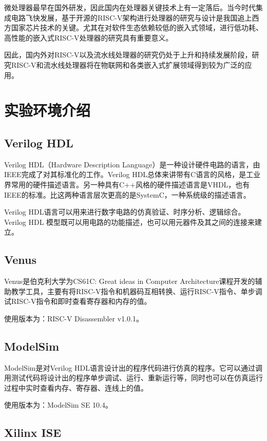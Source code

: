 \documentclass[UTF8,a4paper,autofakebold,15pt]{ctexart}
\begin{document}
	微处理器最早在国外研发，因此国内在处理器关键技术上有一定落后。当今时代集成电路飞快发展，基于开源的RISC-V架构进行处理器的研究与设计是我国追上西方国家芯片技术的关键。尤其在对软件生态依赖较低的嵌入式领域，进行低功耗、高性能的嵌入式RISC-V处理器的研究具有重要意义。\cite{ref6}
	
	因此，国内外对RISC-V以及流水线处理器的研究仍处于上升和持续发展阶段，研究RISC-V和流水线处理器将在物联网和各类嵌入式扩展领域得到较为广泛的应用。

\newpage

\section{实验环境介绍}

\subsection{Verilog HDL}
	Verilog HDL（Hardware Description Language）是一种设计硬件电路的语言，由IEEE完成了对其标准化的工作。Verilog HDL总体来讲带有C语言的风格，是工业界常用的硬件描述语言。另一种具有C++风格的硬件描述语言是VHDL，也有IEEE的标准。比这两种语言层次更高的是SystemC，一种系统级的描述语言。\cite{ref7}
	
	Verilog HDL语言可以用来进行数字电路的仿真验证、时序分析、逻辑综合。Verilog HDL 模型既可以用电路的功能描述，也可以用元器件及其之间的连接来建立。

\subsection{Venus}

	Venus是伯克利大学为CS61C: Great ideas in Computer Architecture课程开发的辅助教学工具，主要有将RISC-V指令和机器码互相转换、运行RISC-V指令、单步调试RISC-V指令和即时查看寄存器和内存的值。
	
	使用版本为：RISC-V Disassembler v1.0.1。

\subsection{ModelSim}
	
	ModelSim是对Verilog HDL语言设计出的程序代码进行仿真的程序。它可以通过调用测试代码将设计出的程序单步调试、运行、重新运行等，同时也可以在仿真运行过程中实时查看内存、寄存器、连线上的值。
	
	使用版本为：ModelSim SE 10.4。

\subsection{Xilinx ISE}
\end{document}
